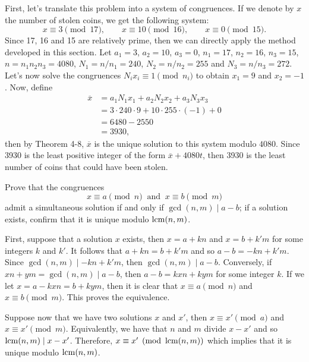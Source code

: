 \begin{solution}
    First, let's translate this problem into a system of congruences. If we denote by $x$ the number of stolen coins, we get the following system:
    $$x \equiv 3 \pmod{17}, \qquad x \equiv 10 \pmod{16}, \qquad x \equiv 0 \pmod{15}.$$
    Since 17, 16 and 15 are relatively prime, then we can directly apply the method developed in this section. Let $a_1 = 3$, $a_2 = 10$, $a_3 = 0$, $n_1 = 17$, $n_2 = 16$, $n_3 = 15$, $n = n_1n_2n_3 = 4080$, $N_1 = n/n_1 = 240$, $N_2 = n / n_2 = 255$ and $N_3 = n / n_3 = 272$. Let's now solve the congruences $N_i x_i \equiv 1 \pmod{n_i}$ to obtain $x_1 = 9$ and $x_2 = -1$. Now, define 
    \begin{align*}
        \overline{x} &= a_1N_1x_1 + a_2 N_2 x_2 + a_3 N_3 x_3 \\
        &= 3 \cdot 240 \cdot 9 + 10 \cdot 255 \cdot (-1) + 0 \\
        &= 6480 - 2550 \\
        &= 3930,
    \end{align*}
    then by Theorem 4-8, $\overline{x}$ is the unique solution to this system modulo $4080$. Since 3930 is the least positive integer of the form $\overline{x} + 4080t$, then 3930 is the least number of coins that could have been stolen. \\
\end{solution}

\begin{exercise}
    Prove that the congruences
    $$x \equiv a \pmod n  \ \text{ and } \ x \equiv b \pmod m$$
    admit a simultaneous solution if and only if $\gcd(n,m) \mid a - b$; if a solution exists, confirm that it is unique modulo $\operatorname{lcm}(n,m)$.\\
\end{exercise}

\begin{solution}
    First, suppose that a solution $x$ exists, then $x = a + kn$ and $x = b + k'm$ for some integers $k$ and $k'$. It follows that $a + kn = b + k'm$ and so $a - b = -kn + k'm$. Since $\gcd(n,m) \mid -kn + k'm$, then $\gcd(n,m) \mid a - b$. Conversely, if $xn + ym = \gcd(n,m) \mid a-b$, then $a - b = kxn + kym$ for some integer $k$. If we let $x = a - kxn = b + kym$, then it is clear that $x \equiv a \pmod n$ and $x \equiv b \pmod m$. This proves the equivalence.

    Suppose now that we have two solutions $x$ and $x'$, then $x \equiv x' \pmod a$ and $x \equiv x' \pmod m$. Equivalently, we have that $n$ and $m$ divide $x - x'$ and so $\operatorname{lcm}(n,m) \mid x - x'$. Therefore, $x \equiv x' \pmod{\operatorname{lcm}(n,m)}$ which implies that it is unique modulo $\operatorname{lcm}(n,m)$. \\
\end{solution}

